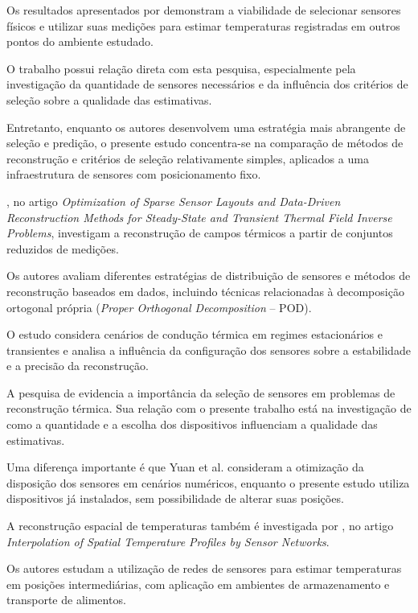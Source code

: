 Os resultados apresentados por  demonstram a viabilidade de selecionar sensores físicos e utilizar suas medições para estimar temperaturas registradas em outros pontos do ambiente estudado.

O trabalho possui relação direta com esta pesquisa, especialmente pela investigação da quantidade de sensores necessários e da influência dos critérios de seleção sobre a qualidade das estimativas.

Entretanto, enquanto os autores desenvolvem uma estratégia mais abrangente de seleção e predição, o presente estudo concentra-se na comparação de métodos de reconstrução e critérios de seleção relativamente simples, aplicados a uma infraestrutura de sensores com posicionamento fixo.

, no artigo \textit{Optimization of Sparse Sensor Layouts and Data-Driven Reconstruction Methods for Steady-State and Transient Thermal Field Inverse Problems}, investigam a reconstrução de campos térmicos a partir de conjuntos reduzidos de medições.

Os autores avaliam diferentes estratégias de distribuição de sensores e métodos de reconstrução baseados em dados, incluindo técnicas relacionadas à decomposição ortogonal própria (\textit{Proper Orthogonal Decomposition} -- POD).

O estudo considera cenários de condução térmica em regimes estacionários e transientes e analisa a influência da configuração dos sensores sobre a estabilidade e a precisão da reconstrução.

A pesquisa de  evidencia a importância da seleção de sensores em problemas de reconstrução térmica. Sua relação com o presente trabalho está na investigação de como a quantidade e a escolha dos dispositivos influenciam a qualidade das estimativas.

Uma diferença importante é que Yuan et al. consideram a otimização da disposição dos sensores em cenários numéricos, enquanto o presente estudo utiliza dispositivos já instalados, sem possibilidade de alterar suas posições.

A reconstrução espacial de temperaturas também é investigada por , no artigo \textit{Interpolation of Spatial Temperature Profiles by Sensor Networks}.

Os autores estudam a utilização de redes de sensores para estimar temperaturas em posições intermediárias, com aplicação em ambientes de armazenamento e transporte de alimentos.

